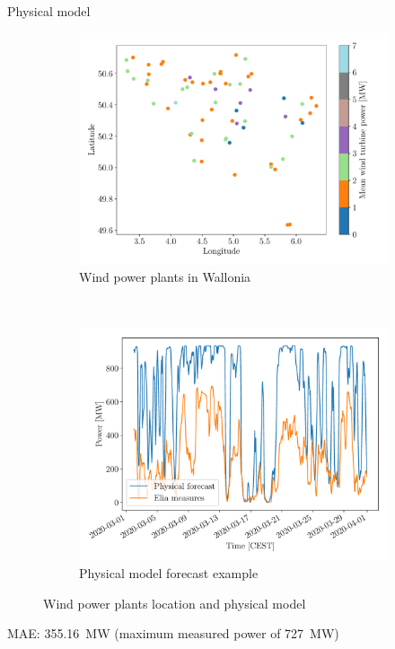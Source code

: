 \documentclass[12pt]{beamer}
\begin{document}
\begin{frame}{Physical model}
	\begin{figure}[H]
		\centering
		\begin{subfigure}[t]{0.48\textwidth}
			\centering
			\includegraphics[width=\textwidth]{resources/pdf/wind_farms.pdf}
			\caption{Wind power plants in Wallonia}
		\end{subfigure}
		~
		\begin{subfigure}[t]{0.48\textwidth}
			\centering
			\includegraphics[width=\textwidth]{resources/pdf/wind_phys.pdf}
			\caption{Physical model forecast example}
		\end{subfigure}
		\caption{Wind power plants location and physical model}
	\end{figure}

	MAE: \SI{355.16}{\mega\watt} (maximum measured power of \SI{727}{\mega\watt})
\end{frame}
\end{document}
